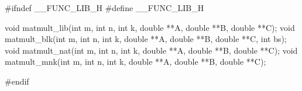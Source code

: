 #ifndef __FUNC_LIB_H
#define __FUNC_LIB_H

void matmult_lib(int m, int n, int k, double **A, double **B, double **C);
void matmult_blk(int m, int n, int k, double **A, double **B, double **C, int bs);
void matmult_nat(int m, int n, int k, double **A, double **B, double **C);
void matmult_mnk(int m, int n, int k, double **A, double **B, double **C);

#endif
